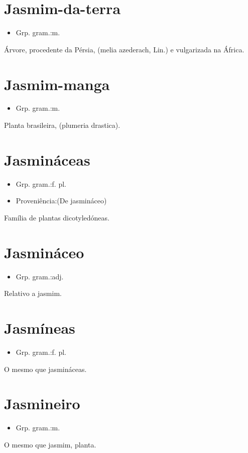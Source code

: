 \documentclass{article}
\begin{document}
\section{Jasmim-da-terra}
\begin{itemize}
\item {Grp. gram.:m.}
\end{itemize}
Árvore, procedente da Pérsia, (\textunderscore melia azederach\textunderscore , Lin.) e vulgarizada na África.
\section{Jasmim-manga}
\begin{itemize}
\item {Grp. gram.:m.}
\end{itemize}
Planta brasileira, (\textunderscore plumeria drastica\textunderscore ).
\section{Jasmináceas}
\begin{itemize}
\item {Grp. gram.:f. pl.}
\end{itemize}
\begin{itemize}
\item {Proveniência:(De \textunderscore jasmináceo\textunderscore )}
\end{itemize}
Família de plantas dicotyledóneas.
\section{Jasmináceo}
\begin{itemize}
\item {Grp. gram.:adj.}
\end{itemize}
Relativo a jasmim.
\section{Jasmíneas}
\begin{itemize}
\item {Grp. gram.:f. pl.}
\end{itemize}
O mesmo que \textunderscore jasmináceas\textunderscore .
\section{Jasmineiro}
\begin{itemize}
\item {Grp. gram.:m.}
\end{itemize}
O mesmo que \textunderscore jasmim\textunderscore , planta.
\end{document}
